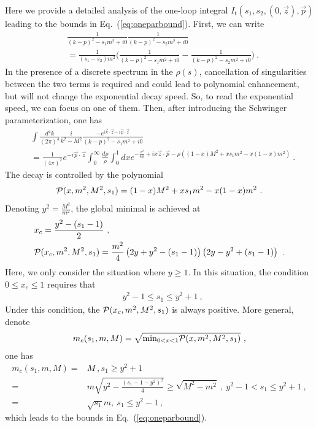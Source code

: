 \documentclass[a4paper,11pt]{article}
\begin{document}
Here we provide a detailed analysis of the one-loop integral $I_t(s_1,s_2,(0,\vec{z}),\vec{p})$ leading to the bounds in Eq.~(\ref{eq:oneparbound}). First, we can write
\begin{align}
&\frac{1}{(k-p)^2-s_1m^2+i0}\frac{1}{(k-p)^2-s_2m^2+i0} \nonumber \\ 
&=\frac{1}{(s_1-s_2)m^2} \bigg(\frac{1}{(k-p)^2-s_1m^2+i0}-\frac{1}{(k-p)^2-s_2m^2+i0}
\bigg) \ . 
\end{align}
In the presence of a discrete spectrum in the $\rho(s)$, cancellation of singularities between the two terms is required and could lead to polynomial enhancement, but will not change the exponential decay speed. So, to read the exponential speed, we can focus on one of them. Then, after introducing the Schwinger parameterization, one has
\begin{align}
&\int\frac{d^4k}{(2\pi)^4}\frac{i}{k^2-M^2}\frac{-e^{i\vec{k}\cdot \vec{z}-i\vec{p}\cdot \vec{z}}}{(k-p)^2-s_1m^2+i0}\nonumber \\ 
&=\frac{1}{(4\pi)^2} e^{-i\vec{p}\cdot \vec{z}}\int_0^{\infty}\frac{d\rho}{\rho} \int_0^1 dx e^{-\frac{z^2}{4\rho}+ix\vec{z}\cdot \vec{p}-\rho\left((1-x)M^2+xs_1m^2-x(1-x)m^2\right)} \ . 
\end{align}
The decay is controlled by the polynomial 
\begin{align}
{\cal P}(x,m^2,M^2,s_1)=(1-x)M^2+xs_1m^2-x(1-x)m^2 \ .
\end{align}
Denoting $y^2=\frac{M^2}{m^2}$, the global minimal is achieved at 
\begin{align}
&x_c=\frac{y^2-(s_1-1)}{2} \ , \\
&{\cal P}(x_c,m^2,M^2,s_1)=\frac{m^2}{4}\left(2y+y^2-(s_1-1)\right) \left(2y-y^2+(s_1-1)\right) \ . 
\end{align}
Here, we only consider the situation where $y\ge 1$. In this situation,  the condition $0\le x_c\le 1$ requires that
\begin{align}
&y^2-1\le s_1\le y^2+1 \ , 
\end{align}
Under this condition, the ${\cal P}(x_c,m^2,M^2,s_1)$ is always positive. More general, denote
\begin{align}
    m_c(s_1,m,M)=\sqrt{{\rm min}_{0<x<1} {\cal P}(x,m^2,M^2,s_1)} \ , 
\end{align}
one has
\begin{align}
m_c(s_1,m,M)=& \nonumber M \ , s_1\ge y^2+1  \\
=&m\sqrt{y^2-\frac{(s_1-1-y^2)^2}{4}} \ge \sqrt{M^2-m^2} \ ,  \  y^2-1<s_1\le y^2+1 \ , \\
=&\sqrt{s_1} m, \   s_1\le y^2-1 \ , 
\end{align}
which leads to the bounds in Eq.~(\ref{eq:oneparbound}).
\end{document}
